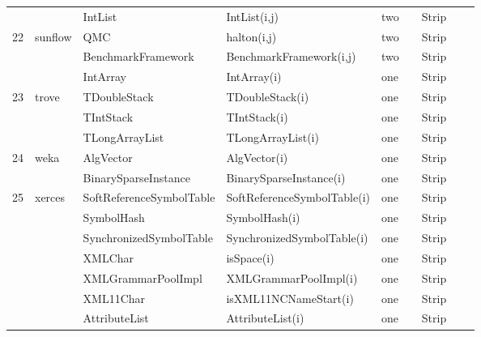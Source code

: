 \documentclass[runningheads,a4paper]{llncs}
\begin{document}
\begin{table}[h]
{\begin{tabular}{|l|l|l|l|l|l|l|l|l|}
	&				& IntList					& IntList(i,j)				& two		& 		& Strip 										\\ 	
22	&	sunflow		& QMC					& halton(i,j)				& two		&		& Strip  										\\ 
	&				& BenchmarkFramework	& BenchmarkFramework(i,j) & two		&		& Strip   										\\ 
	&				& IntArray				& IntArray(i)				& one		&		& Strip 										\\ 	
23	&	trove		& TDoubleStack			& TDoubleStack(i)		& one		&		& Strip  										\\ 
	&				& TIntStack				& TIntStack(i)			& one		&		& Strip  										\\ 
	&				& TLongArrayList			& TLongArrayList(i)		& one		&		& Strip  										\\ 
24	&	weka		& AlgVector				& AlgVector(i)			& one		&		& Strip  										\\ 
	&				& BinarySparseInstance	& BinarySparseInstance(i)& one		& 		& Strip 										\\ 
25	&	xerces		& SoftReferenceSymbolTable& SoftReferenceSymbolTable(i) & one	&		& Strip  										\\ 
	&				& SymbolHash			& SymbolHash(i)			& one		&		& Strip 										\\ 
	&				& SynchronizedSymbolTable& SynchronizedSymbolTable(i) & one	& 		& Strip  										\\ 
	&				& XMLChar				& isSpace(i)				& one		& 		& Strip 										\\ 
	&				& XMLGrammarPoolImpl	& XMLGrammarPoolImpl(i)	& one		&		& Strip   										\\ 
	&				& XML11Char			& isXML11NCNameStart(i)	& one		&		& Strip  										\\ 
	&				& AttributeList			& AttributeList(i)			& one		&		& Strip  										\\ 
\hline
\end{tabular}
}
\bigskip
\label{table:failureDomains6}
\end{table}
\end{document}
